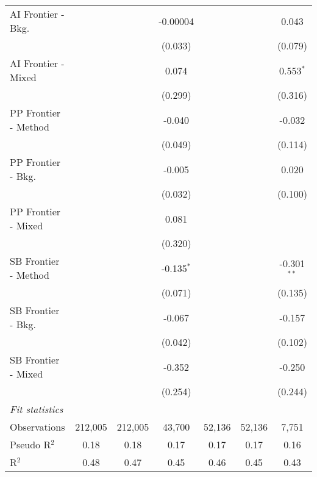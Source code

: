 \begin{tabular}{lcccccc}
   AI Frontier - Bkg.   &               &               & -0.00004      &               &               & 0.043\\   
                        &               &               & (0.033)       &               &               & (0.079)\\   
   AI Frontier - Mixed  &               &               & 0.074         &               &               & 0.553$^{*}$\\   
                        &               &               & (0.299)       &               &               & (0.316)\\   
   PP Frontier - Method &               &               & -0.040        &               &               & -0.032\\   
                        &               &               & (0.049)       &               &               & (0.114)\\   
   PP Frontier - Bkg.   &               &               & -0.005        &               &               & 0.020\\   
                        &               &               & (0.032)       &               &               & (0.100)\\   
   PP Frontier - Mixed  &               &               & 0.081         &               &               &   \\   
                        &               &               & (0.320)       &               &               &   \\   
   SB Frontier - Method &               &               & -0.135$^{*}$  &               &               & -0.301$^{**}$\\   
                        &               &               & (0.071)       &               &               & (0.135)\\   
   SB Frontier - Bkg.   &               &               & -0.067        &               &               & -0.157\\   
                        &               &               & (0.042)       &               &               & (0.102)\\   
   SB Frontier - Mixed  &               &               & -0.352        &               &               & -0.250\\   
                        &               &               & (0.254)       &               &               & (0.244)\\   
   \midrule
   \emph{Fit statistics}\\
   Observations         & 212,005       & 212,005       & 43,700        & 52,136        & 52,136        & 7,751\\  
   Pseudo R$^2$         & 0.18          & 0.18          & 0.17          & 0.17          & 0.17          & 0.16\\  
   R$^2$                & 0.48          & 0.47          & 0.45          & 0.46          & 0.45          & 0.43\\  
   

\end{tabular}

